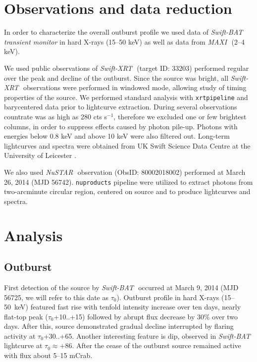 \documentclass[a4paper,fleqn,usenatbib]{mnras}
\def\swiftx{{\em Swift-XRT\,}}
\def\swiftb{{\em Swift-BAT\,}}
\def\nustar{{\em NuSTAR\,}}
\def\maxi{{\em MAXI\,}}
\begin{document}
\section{Observations and data reduction}
\label{sec:datared} 
In order to characterize the overall outburst profile we used data of \swiftb\, {\it transient monitor} \citep{krimm13bat} in hard X-rays (15--50 keV) as well as data from \maxi\, \citep{matsuoka13maxi} (2--4 keV).

We used public observations of \swiftx\, (target ID: 33203) performed regular over the peak and decline of the outburst.  Since the source was bright, all \swiftx\, observations were performed in windowed mode, allowing study of timing properties of the source. We performed standard analysis with {\texttt{xrtpipeline}} and barycentered data prior to lightcurve extraction. During several observations countrate was as high as 280 cts s$^{-1}$, therefore we excluded one or few brightest columns, in order to suppress effects caused by photon pile-up. Photons with energies below 0.8 keV and above 10 keV were also filtered out. 
Long-term lightcurves and spectra were obtained from UK Swift Science Data Centre at the University of Leicester \citep{evans09}.

We also used \nustar\, observation (ObsID: 80002018002) performed at March 26, 2014 (MJD 56742).  {\texttt{nuproducts}} pipeline were utilized to extract photons  from two-arcminute circular region, centered on source and to produce lightcurves and spectra.

\section{Analysis}
\subsection{Outburst}
First detection of the source by \swiftb\, \citep{krimm14_atel} occurred at March 9, 2014 (MJD 56725, we will refer to this date as $\tau_{0}$). Outburst profile in hard X-rays (15--50~keV) featured fast rise with tenfold intensity increase over ten days, nearly flat-top peak ($\tau_{0}$+10..+15) followed by abrupt flux decrease by 30\% over two days. After this, source demonstrated gradual decline interrupted by flaring activity at $\tau_{0}$+30..+65. Another interesting feature is dip, observed in \swiftb\, lightcurve at $\tau_{0} \approx +86$. After the cease of the outburst source remained active with flux about 5--15 mCrab. 
\end{document}
